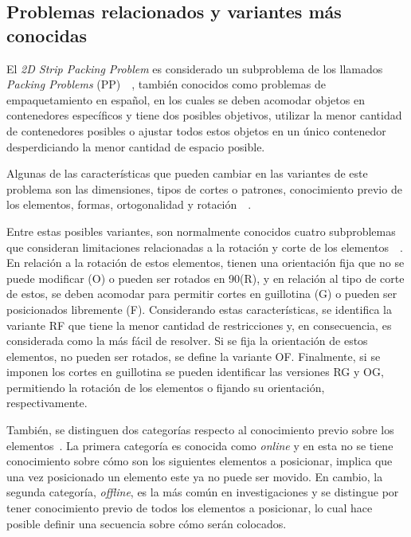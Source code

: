 \documentclass[letter, 10pt]{article}
\begin{document}
\subsection{Problemas relacionados y variantes m\'as conocidas}

El \emph{2D Strip Packing Problem} es considerado un subproblema de los llamados \emph{Packing Problems} (PP)~\cite{babaouglu2017solving}~\cite{lodi2002two}, tambi\'en conocidos como problemas de empaquetamiento en espa\~nol, en los cuales se deben acomodar objetos en contenedores espec\'ificos y tiene dos posibles objetivos, utilizar la menor cantidad de contenedores posibles o ajustar todos estos objetos en un \'unico contenedor desperdiciando la menor cantidad de espacio posible.

Algunas de las caracter\'isticas que pueden cambiar en las variantes de este problema son las dimensiones, tipos de cortes o patrones, conocimiento previo de los elementos, formas, ortogonalidad y rotaci\'on~\cite{junior2022rectangular}~\cite{oliveira2016survey}.

Entre estas posibles variantes, son normalmente conocidos cuatro subproblemas que consideran limitaciones relacionadas a la rotaci\'on y corte de los elementos~\cite{junior2022rectangular}~\cite{lodi2002two}. En relaci\'on a la rotaci\'on de estos elementos, tienen una orientaci\'on fija que no se puede modificar (O) o pueden ser rotados en 90\textdegree (R), y en relaci\'on al tipo de corte de estos, se deben acomodar para permitir cortes en guillotina (G) o pueden ser posicionados libremente (F). Considerando estas caracter\'isticas, se identifica la variante RF que tiene la menor cantidad de restricciones y, en consecuencia, es considerada como la m\'as f\'acil de resolver. Si se fija la orientaci\'on de estos elementos, no pueden ser rotados, se define la variante OF. Finalmente, si se imponen los cortes en guillotina se pueden identificar las versiones RG y OG, permitiendo la rotaci\'on de los elementos o fijando su orientaci\'on, respectivamente.

Tambi\'en, se distinguen dos categor\'ias respecto al conocimiento previo sobre los elementos~\cite{oliveira2016survey}. La primera categor\'ia es conocida como \emph{online} y en esta no se tiene conocimiento sobre c\'omo son los siguientes elementos a posicionar, implica que una vez posicionado un elemento este ya no puede ser movido. En cambio, la segunda categor\'ia, \emph{offline}, es la m\'as com\'un en investigaciones y se distingue por tener conocimiento previo de todos los elementos a posicionar, lo cual hace posible definir una secuencia sobre c\'omo ser\'an colocados.
\end{document}
